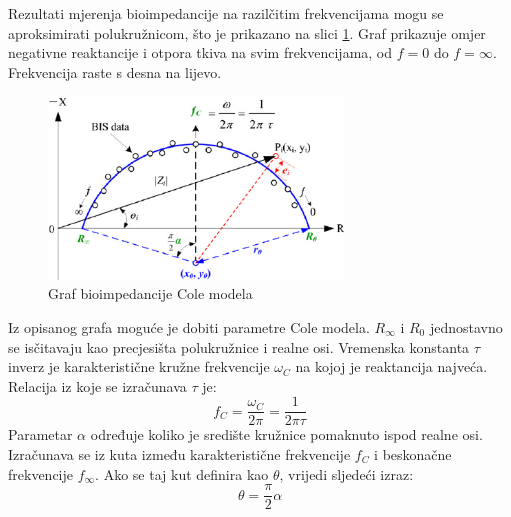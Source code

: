 \documentclass[../diplomski_rad.tex]{subfiles}
\begin{document}
Rezultati mjerenja bioimpedancije na razilčitim frekvencijama mogu se aproksimirati polukružnicom,  
što je prikazano na slici \ref{slk:cole_graf}. 
Graf prikazuje omjer negativne reaktancije i otpora tkiva na svim frekvencijama, 
od $f=0$ do $f=\infty$. Frekvencija raste s desna na lijevo. 
\begin{figure}[htb]
    \centering
    \includegraphics[width=0.7\textwidth]{Figures/cole_plot.png} 
    \caption{Graf bioimpedancije Cole modela \cite{Yang_2013}}
    \label{slk:cole_graf}
\end{figure}
Iz opisanog grafa moguće je dobiti parametre Cole modela\cite{Yang_2013}.
$R_{\infty}$ i $R_{0}$ jednostavno se isčitavaju kao precjesišta polukružnice i realne osi.
Vremenska konstanta $\tau$ inverz je karakteristične kružne frekvencije $\omega_{C}$ na kojoj je reaktancija najveća.
Relacija iz koje se izračunava $\tau$ je:
\begin{equation}
    \label{jed:cole}
    f_{C} = \frac{\omega_{C}}{2\pi} = \frac{1}{2\pi\tau} 
\end{equation} 
Parametar $\alpha$ određuje koliko je središte kružnice pomaknuto ispod realne osi. 
Izračunava se iz kuta između karakteristične frekvencije $f_{C}$ i beskonačne frekvencije $f_{\infty}$. 
Ako se taj kut definira kao $\theta$, vrijedi sljedeći izraz:
\begin{equation}
    \label{jed:cole}
    \theta = \frac{\pi}{2}\alpha 
\end{equation} 
\end{document}
